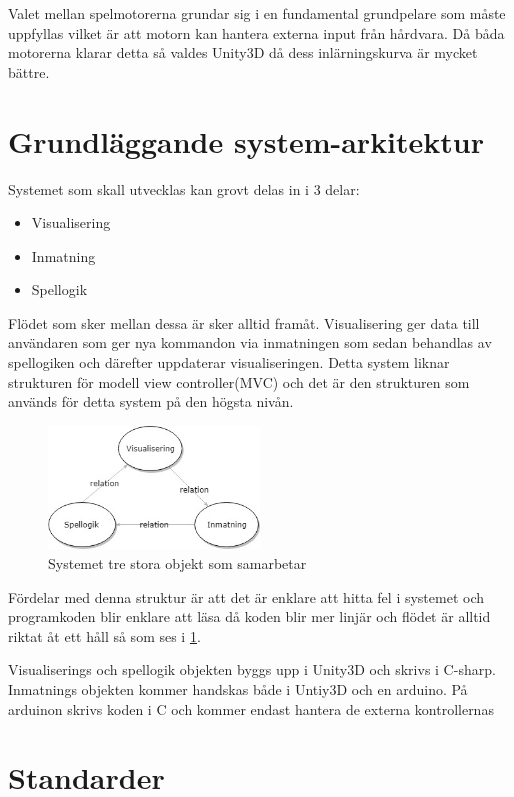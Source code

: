 \documentclass[a4paper,12pt,oneside,final]{extbook}
\begin{document}
 Valet mellan spelmotorerna grundar sig i en fundamental grundpelare som måste uppfyllas vilket är att motorn kan hantera externa input från hårdvara. Då båda motorerna klarar detta så valdes Unity3D då dess inlärningskurva är mycket bättre. 

\section{Grundläggande system-arkitektur}
Systemet som skall utvecklas kan grovt delas in i 3 delar:
\begin{itemize}
	\item Visualisering
	\item Inmatning
	\item Spellogik
\end{itemize}
Flödet som sker mellan dessa är sker alltid framåt. Visualisering ger data till användaren som ger nya kommandon via inmatningen som sedan behandlas av spellogiken och därefter uppdaterar visualiseringen. Detta system liknar strukturen för modell view controller(MVC)\cite{Design} och det är den strukturen som används för detta system på den högsta nivån. 



\begin{figure}[h]
	\includegraphics[width=0.5\textwidth, center]{System.jpg}
	\caption{Systemet tre stora objekt som samarbetar}
	\label{fig:System}
\end{figure}

Fördelar med denna struktur är att det är enklare att hitta fel i systemet och programkoden blir enklare att läsa då koden blir mer linjär och flödet är alltid riktat åt ett håll så som ses i \ref{fig:System}.

Visualiserings och spellogik objekten byggs upp i Unity3D och skrivs i C-sharp. Inmatnings objekten kommer handskas både i Untiy3D och en arduino. På arduinon skrivs koden i C och kommer endast hantera de externa kontrollernas  

\section{Standarder}
\end{document}
